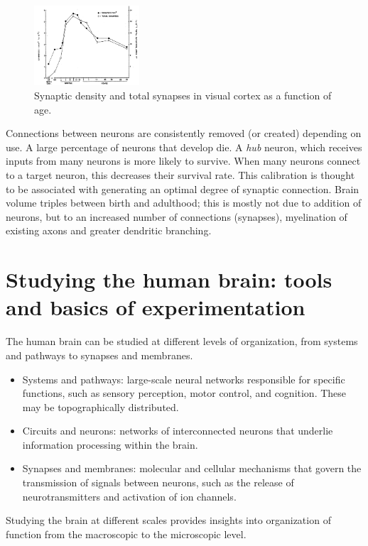 \begin{figure}
  \centering
  \includegraphics[width=0.35\textwidth]{images/neuroplasticity.png}
  \caption{Synaptic density and total synapses in visual cortex as a function of age.}
\end{figure}
Connections between neurons are consistently removed (or created) depending on use.
A large percentage of neurons that develop die. A \textit{hub} neuron, which receives inputs from many neurons is more likely to survive. When many neurons connect to a target neuron, this decreases their survival rate. This calibration is thought to be associated with generating an optimal degree of 
synaptic connection.
Brain volume triples between birth and adulthood; this is mostly not due to addition of neurons, but to an increased number of connections (synapses), myelination of existing axons and greater dendritic branching.

\section{Studying the human brain: tools and basics of experimentation}
The human brain can be studied at different levels of organization, from systems and pathways to synapses and membranes.
\begin{itemize}
    \item Systems and pathways: large-scale neural networks responsible for specific functions, such as sensory perception, motor control, and cognition. These may be topographically distributed.
    \item Circuits and neurons: networks of interconnected neurons that underlie information processing within the brain.
    \item Synapses and membranes: molecular and cellular mechanisms that govern the transmission of signals between neurons, such as the release of neurotransmitters and activation of ion channels.
\end{itemize}
Studying the brain at different scales provides insights into organization of function from the macroscopic to the microscopic level.

